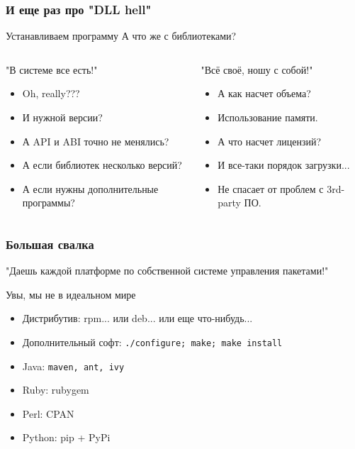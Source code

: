 \begin{frame}
	\frametitle{И еще раз про "DLL hell"}
	
	\begin{block}{Устанавливаем программу}
	А что же с библиотеками?
	\end{block}

	\pause

	\begin{columns}
		\begin{block}{"В системе все есть!"}
		\begin{itemize}
			\item Oh, really???
			\item И нужной версии?
			\item А API и ABI точно не менялись?
			\item А если библиотек несколько версий?
			\item А если нужны дополнительные программы?
		\end{itemize}
		\end{block}
		\pause
		\begin{block}{"Всё своё, ношу с собой!"}
		\begin{itemize}
			\item А как насчет объема?
			\item Использование памяти.
			\item А что насчет лицензий?
			\item И все-таки порядок загрузки...
			\item Не спасает от проблем с 3rd-party ПО.
		\end{itemize}
		\end{block}
	\end{columns}
\end{frame}

\begin{frame}
	\frametitle{Большая свалка}

	\begin{center}
		"Даешь каждой платформе по собственной системе управления пакетами!"
	\end{center}

	\begin{block}{Увы, мы не в идеальном мире}
		\begin{itemize}
			\item Дистрибутив: rpm... или deb... или еще что-нибудь...
			\item Дополнительный софт: {\tt ./configure; make; make install}
			\item Java: {\tt maven, ant, ivy} 
			\item Ruby: rubygem
			\item Perl: CPAN
			\item Python: pip + PyPi
		\end{itemize}
	\end{block}

\end{frame}

